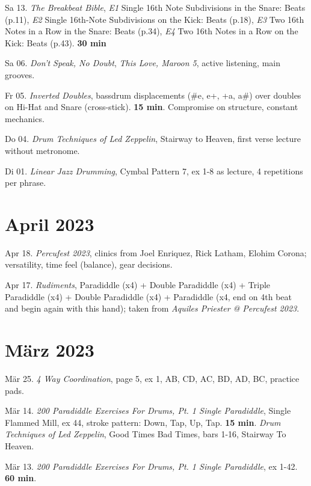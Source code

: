 \documentclass[
]{book}
\begin{document}
Sa 13. \emph{The Breakbeat Bible}, \emph{E1} Single 16th Note Subdivisions in the Snare: Beats (p.11), \emph{E2} Single 16th-Note Subdivisions on the Kick: Beats (p.18), \emph{E3} Two 16th Notes in a Row in the Snare: Beats (p.34), \emph{E4} Two 16th Notes in a Row on the Kick: Beats (p.43). \textbf{30 min}

Sa 06. \emph{Don't Speak, No Doubt}, \emph{This Love, Maroon 5}, active listening, main grooves.

Fr 05. \emph{Inverted Doubles}, bassdrum displacements (\#e, e+, +a, a\#) over doubles on Hi-Hat and Snare (cross-stick). \textbf{15 min}. Compromise on structure, constant mechanics.

Do 04. \emph{Drum Techniques of Led Zeppelin}, Stairway to Heaven, first verse lecture without metronome.

Di 01. \emph{Linear Jazz Drumming}, Cymbal Pattern 7, ex 1-8 as lecture, 4 repetitions per phrase.

\hypertarget{april-2023}{%
\section*{April 2023}\label{april-2023}}

Apr 18. \emph{Percufest 2023}, clinics from Joel Enriquez, Rick Latham, Elohim Corona; versatility, time feel (balance), gear decisions.

Apr 17. \emph{Rudiments}, Paradiddle (x4) + Double Paradiddle (x4) + Triple Paradiddle (x4) + Double Paradiddle (x4) + Paradiddle (x4, end on 4th beat and begin again with this hand); taken from \emph{Aquiles Priester @ Percufest 2023}.

\hypertarget{muxe4rz-2023}{%
\section*{März 2023}\label{muxe4rz-2023}}

Mär 25. \emph{4 Way Coordination}, page 5, ex 1, AB, CD, AC, BD, AD, BC, practice pads.

Mär 14. \emph{200 Paradiddle Exercises For Drums, Pt. 1 Single Paradiddle}, Single Flammed Mill, ex 44, stroke pattern: Down, Tap, Up, Tap. \textbf{15 min}. \emph{Drum Techniques of Led Zeppelin}, Good Times Bad Times, bars 1-16, Stairway To Heaven.

Mär 13. \emph{200 Paradiddle Exercises For Drums, Pt. 1 Single Paradiddle}, ex 1-42. \textbf{60 min}.
\end{document}
